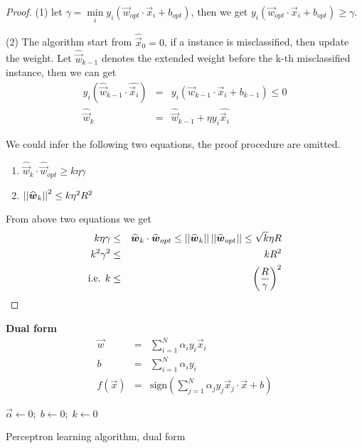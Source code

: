 \begin{proof}
(1) let $\gamma=\min\limits_{i} y_i(\vec{w}_{opt} \cdot \vec{x}_i+b_{opt})$, then we get $y_i(\vec{w}_{opt} \cdot \vec{x}_i+b_{opt}) \geq \gamma$.

(2) The algorithm start from $\widehat{\vec{x}}_0=0$, if a instance is misclassified, then update the weight. Let $\widehat{\vec{w}}_{k-1}$ denotes the extended weight before the k-th misclassified instance, then we can get
\begin{eqnarray}
y_i(\widehat{\vec{w}}_{k-1} \cdot \widehat{\vec{x}_i})&=&y_i(\vec{w}_{k-1} \cdot \vec{x}_i+b_{k-1}) \leq 0\\
\widehat{\vec{w}}_k&=&\widehat{\vec{w}}_{k-1}+\eta y_i \widehat{\vec{x}_i}
\end{eqnarray}

We could infer the following two equations, the proof procedure are omitted.
\begin{enumerate}
\item $\widehat{\vec{w}}_k \cdot \widehat{\vec{w}}_{opt} \geq k\eta\gamma$
\item $\abs{\abs{\widehat{\vec{w}}_k}}^2 \leq k\eta^2R^2$
\end{enumerate}

From above two equations we get
\begin{eqnarray}
\nonumber k\eta\gamma & \leq & \widehat{\vec{w}}_k \cdot \widehat{\vec{w}}_{opt} \leq \abs{\abs{\widehat{\vec{w}}_k}}\abs{\abs{\widehat{\vec{w}}_{opt}}} \leq \sqrt k \eta R \\
\nonumber k^2\gamma^2 & \leq & kR^2 \\
\nonumber \text{i.e. } k & \leq & \left(\dfrac{R}{\gamma}\right)^2
\end{eqnarray}
\end{proof}


\textbf{Dual form}
\begin{eqnarray}
\vec{w}&=&\sum\limits_{i=1}^{N} \alpha_iy_i\vec{x}_i \\
b&=&\sum\limits_{i=1}^{N} \alpha_iy_i \\
f(\vec{x})&=&\text{sign}\left(\sum\limits_{j=1}^{N} \alpha_jy_j\vec{x}_j \cdot \vec{x}+b\right)
\end{eqnarray}

\begin{algorithm}[htbp]
    \SetAlgoNoLine
  
    $\vec{\alpha} \leftarrow 0;\; b \leftarrow 0;\; k \leftarrow 0$\;
\caption{Perceptron learning algorithm, dual form}
\end{algorithm}


